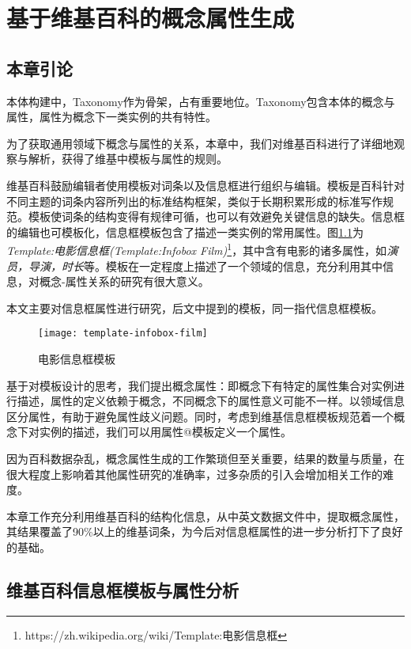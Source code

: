 \chapter{基于维基百科的概念属性生成}
\label{cha:concept-property}

\section{本章引论}

本体构建中，Taxonomy作为骨架，占有重要地位。Taxonomy包含本体的概念与属性，属性为概念下一类实例的共有特性。

为了获取通用领域下概念与属性的关系，本章中，我们对维基百科进行了详细地观察与解析，获得了维基中模板与属性的规则。

维基百科鼓励编辑者使用模板对词条以及信息框进行组织与编辑。模板是百科针对不同主题的词条内容所列出的标准结构框架，类似于长期积累形成的标准写作规范。模板使词条的结构变得有规律可循，也可以有效避免关键信息的缺失。信息框的编辑也可模板化，信息框模板包含了描述一类实例的常用属性。图\ref{fig:template-infobox-film}为\textit{Template:电影信息框(Template:Infobox Film)}\footnote{https://zh.wikipedia.org/wiki/Template:电影信息框}，其中含有电影的诸多属性，如\textit{演员，导演，时长}等。模板在一定程度上描述了一个领域的信息，充分利用其中信息，对概念-属性关系的研究有很大意义。

本文主要对信息框属性进行研究，后文中提到的模板，同一指代{\heiti 信息框模板}。

\begin{figure}[H]
  \centering
  \texttt{[image: template-infobox-film]}
  \caption{电影信息框模板}
  \label{fig:template-infobox-film}
\end{figure}

基于对模板设计的思考，我们提出概念属性：即概念下有特定的属性集合对实例进行描述，属性的定义依赖于概念，不同概念下的属性意义可能不一样。以领域信息区分属性，有助于避免属性歧义问题。同时，考虑到维基信息框模板规范着一个概念下对实例的描述，我们可以用{\heiti 属性@模板}定义一个属性。

因为百科数据杂乱，概念属性生成的工作繁琐但至关重要，结果的数量与质量，在很大程度上影响着其他属性研究的准确率，过多杂质的引入会增加相关工作的难度。

本章工作充分利用维基百科的结构化信息，从中英文数据文件中，提取概念属性，其结果覆盖了90\%以上的维基词条，为今后对信息框属性的进一步分析打下了良好的基础。

\section{维基百科信息框模板与属性分析}
\label{sec:template-analysis}

